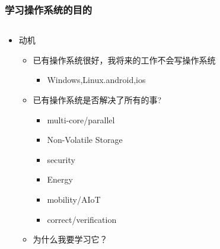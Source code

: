 \begin{frame}
    \frametitle{学习操作系统的目的}
    \begin{columns}[t]
    \begin{column}{0.5\textwidth}
    \begin{itemize}
    \item 动机
    \begin{itemize}
    \item 已有操作系统很好，我将来的工作不会写操作系统
    \begin{itemize}
        \item Windows,Linux.android,ios
    \end{itemize}
    \item 已有操作系统是否解决了所有的事?
        \begin{itemize}
        \item multi-core/parallel
        \item Non-Volatile Storage
        \item security
        \item Energy
        \item mobility/AIoT
        \item correct/verification
    \end{itemize}
    \item 为什么我要学习它？
        \end{itemize}
    \end{itemize}
     \end{column}

     
    \begin{column}{0.5\textwidth}
    
    \end{column}
    
    \end{columns}
    
    \end{frame}

